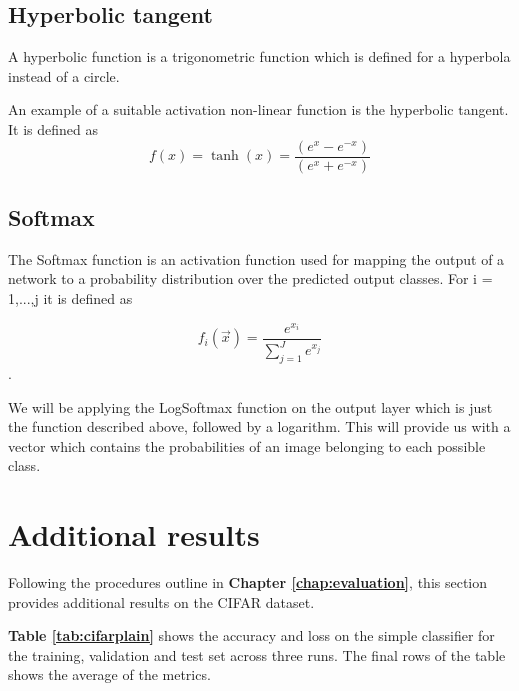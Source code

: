 \documentclass{l4proj}
\begin{document}
\begin{appendices}
\subsection{Hyperbolic tangent}
A hyperbolic function is a trigonometric function which is defined for a hyperbola instead of a circle. 

An example of a suitable activation non-linear function is the hyperbolic tangent. It is defined as
\begin{equation}
    f(x)=\tanh(x)={\frac {(e^{x}-e^{-x})}{(e^{x}+e^{-x})}}
\end{equation}

\subsection{Softmax}
The Softmax function is an activation function used for mapping the output of a network to a probability distribution over the predicted output classes. For i = 1,...,j it is defined as

\begin{equation}
    f_{i}({\vec {x}})={\frac {e^{x_{i}}}{\sum _{j=1}^{J}e^{x_{j}}}} 
\end{equation}.

We will be applying the LogSoftmax function on the output layer which is just the function described above, followed by a logarithm. This will provide us with a vector which contains the probabilities of an image belonging to each possible class.

\section{Additional results}
\label{cifarres}
Following the procedures outline in \textbf{Chapter \ref{chap:evaluation}}, this section provides additional results on the CIFAR dataset.

\textbf{Table \ref{tab:cifarplain}} shows the accuracy and loss on the simple classifier for the training, validation and test set across three runs. The final rows of the table shows the average of the metrics.


\end{appendices}
\end{document}
